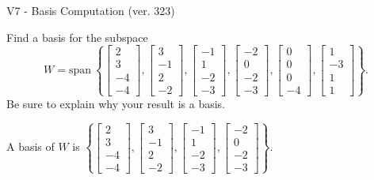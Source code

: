 \begin{exercise}
  \begin{exerciseTitle}V7 - Basis Computation (ver. 323)\end{exerciseTitle}
  \begin{exerciseStatement}
    Find a basis for the subspace 
\[W=\mathrm{span}\ \left\{\left[\begin{array}{r}
2 \\
3 \\
-4 \\
-4
\end{array}\right] , \left[\begin{array}{r}
3 \\
-1 \\
2 \\
-2
\end{array}\right] , \left[\begin{array}{r}
-1 \\
1 \\
-2 \\
-3
\end{array}\right] , \left[\begin{array}{r}
-2 \\
0 \\
-2 \\
-3
\end{array}\right] , \left[\begin{array}{r}
0 \\
0 \\
0 \\
-4
\end{array}\right] , \left[\begin{array}{r}
1 \\
-3 \\
1 \\
1
\end{array}\right]\right\}.\]
 Be sure to explain why your result is a basis.


  \end{exerciseStatement}
  \begin{exerciseAnswer}
   A basis of \(W\) is  \(\left\{\left[\begin{array}{r}
2 \\
3 \\
-4 \\
-4
\end{array}\right] , \left[\begin{array}{r}
3 \\
-1 \\
2 \\
-2
\end{array}\right] , \left[\begin{array}{r}
-1 \\
1 \\
-2 \\
-3
\end{array}\right] , \left[\begin{array}{r}
-2 \\
0 \\
-2 \\
-3
\end{array}\right]\right\}\).
  


  \end{exerciseAnswer}
\end{exercise}